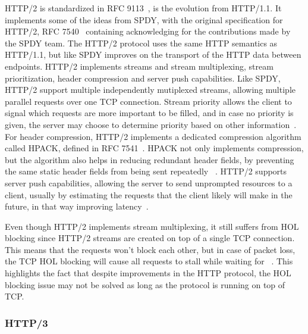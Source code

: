 \documentclass[english, 12pt, a4paper, elec, utf8, a-2b, online]{aaltothesis}
\begin{document}
HTTP/2 is standardized in RFC 9113~\cite{rfc9113}, is the evolution from HTTP/1.1.
It implements some of the ideas from SPDY, with the original specification for
HTTP/2, RFC 7540~\cite{rfc7540} containing acknowledging for the contributions made by the SPDY
team. The HTTP/2 protocol uses the same HTTP semantics as HTTP/1.1, but like SPDY
improves on the transport of the HTTP data between endpoints. HTTP/2 implements
streams and stream multiplexing, stream prioritization, header compression and
server push capabilities. Like SPDY, HTTP/2 support multiple independently
mutiplexed streams, allowing multiple parallel requests over one TCP connection.
Stream priority allows the client to signal which requests are more important to
be filled, and in case no priority is given, the server may choose to determine
priority based on other information~\cite{rfc9113}. For header compression, HTTP/2 implements a
dedicated compression algorithm called HPACK, defined in RFC 7541~\cite{rfc7541}.
HPACK not only implements compression, but the algorithm also helps in reducing
redundant header fields, by preventing the same static header fields from
being sent repeatedly ~\cite{rfc7541}. HTTP/2 supports server push capabilities,
allowing the server to send unprompted resources to a client, usually by estimating
the requests that the client likely will make in the future, in that way improving
latency~\cite{rfc9114}.

Even though HTTP/2 implements stream multiplexing, it still suffers from HOL blocking
since HTTP/2 streams are created on top of a single TCP
connection. This means that the requests won't block each other, but in case of
packet loss, the TCP HOL blocking will cause all requests to stall while waiting
for ~\cite{rfc9113}. This highlights the fact that despite improvements in the
HTTP protocol, the HOL blocking issue may not be solved as long as the protocol
is running on top of TCP.

\subsubsection{HTTP/3}
\end{document}
